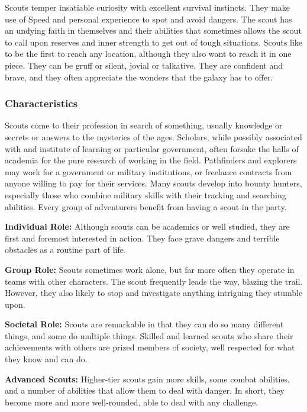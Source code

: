 \documentclass[a4paper,10pt,final,twocolumn,oneside]{book}
\newcommand{\itemLine}[2]{\textbf{#1:}{ #2}\par}
\begin{document}
Scouts temper insatiable curiosity with excellent survival instincts. They make use of Speed and personal experience to spot and avoid dangers. The scout has an undying faith in themselves and their abilities that sometimes allows the scout to call upon reserves and inner strength to get out of tough situations. Scouts like to be the first to reach any location, although they also want to reach it in one piece. They can be gruff or silent, jovial or talkative. They are confident and brave, and they often appreciate the wonders that the galaxy has to offer.

\subsubsection*{Characteristics}
\label{subsub:scoutCharacteristics}

Scouts come to their profession in search of something, usually knowledge or secrets or answers to the mysteries of the ages. Scholars, while possibly associated with and institute of learning or particular government, often forsake the halls of academia for the pure research of working in the field. Pathfinders and explorers may work for a government or military institutions, or freelance contracts from anyone willing to pay for their services. Many scouts develop into bounty hunters, especially those who combine military skills with their tracking and searching abilities. Every group of adventurers benefit from having a scout in the party.

\itemLine{Individual Role}{Although scouts can be academics or well studied, they are first and foremost interested in action. They face grave dangers and terrible obstacles as a routine part of life.}

\itemLine{Group Role}{Scouts sometimes work alone, but far more often they operate in teams with other characters. The scout frequently leads the way, blazing the trail. However, they also likely to stop and investigate anything intriguing they stumble upon.}

\itemLine{Societal Role}{Scouts are remarkable in that they can do so many different things, and some do multiple things. Skilled and learned scouts who share their achievements with others are prized members of society, well respected for what they know and can do.}

\itemLine{Advanced Scouts}{Higher-tier scouts gain more skills, some combat abilities, and a number of abilities that allow them to deal with danger. In short, they become more and more well-rounded, able to deal with any challenge.}
\end{document}
